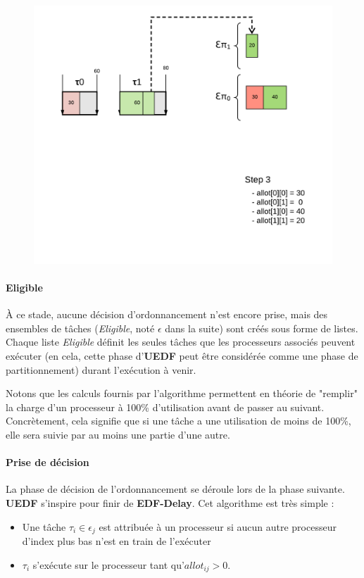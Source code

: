 \begin{figure}[H]
		\includegraphics[scale=0.5]{img/uedf/uedf4}
	\end{figure}
	\paragraph{Eligible}
	À ce stade, aucune décision d'ordonnancement n'est encore prise, mais des ensembles de tâches (\textit{Eligible}, 
	noté $\epsilon$ dans la suite) sont créés sous forme de listes. Chaque liste \textit{Eligible} définit 
	les seules tâches que les processeurs associés peuvent exécuter (en cela, cette phase d'\textbf{UEDF} peut 
	être considérée comme une phase de partitionnement) durant l'exécution à venir.\newline
	
	Notons que les calculs fournis par l'algorithme permettent en théorie de "remplir" 
	la charge d'un processeur à 100\% d'utilisation avant de passer au suivant. Concrètement, 
	cela signifie que si une tâche a une utilisation de moins de 100\%, elle sera suivie par 
	au moins une partie d'une autre.\newline

	\paragraph{Prise de décision}
	La phase de décision de l'ordonnancement se déroule lors de la phase suivante.
	\textbf{UEDF} s'inspire pour finir de \textbf{EDF-Delay}. 
	Cet algorithme est très simple :
	\begin{itemize}
		\item Une tâche $\tau_i \in \epsilon_j$ est attribuée à un processeur si aucun autre processeur d'index plus bas n'est en train de l'exécuter
		\item $\tau_i$ s'exécute sur le processeur tant qu'$allot_{ij} > 0$.
	\end{itemize}
	
